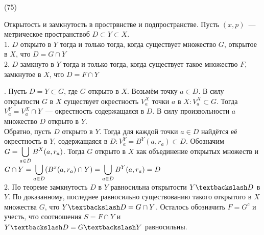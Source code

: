 (75)

\T \q Открытость и замкнутость в прострвнстве и подпространстве. Пусть $(x, p)$~--- метрическое пространствоб $D \subset Y\subset X$.\\
1. $D$ открыто в $Y$ тогда и только тогда, когда существует множество $G$, открытое в $X$, что $D = G \cap Y$\\
2. $D$ замкнуто в $Y$ тогда и только тогда, когда существует такое множество $F$, замкнутое в $X$, что $D = F\cap Y$

. Пусть $D = Y \subset G$, где $G$ открыто в $X$. Возьмём точку $a \in D$. В силу открытости $G$ в $X$ существует окрестность $V^X_a$ точки $a$ в $X: V^X_a \subset G$. Тогда $V^Y_a = V^X_a \cap Y$~--- окрестность содержащаяся в $D$. В силу произвольности $a$ множество $D$ открыто в $Y$.\\
Обратно, пусть $D$ открыто в $Y$. Тогда для каждой точки $a \in D$ найдётся её окрестность в $Y$, содержащаяся в $D: V^Y_a = B^Y(a, r_a) \subset D$. Обозначим $G = \displaystyle\bigcup_{a \in D} B^X(a, r_a)$. Тогда $G$ открыто в $X$ как объединение открытых множеств и $G \cap Y = \displaystyle\bigcup\limits_{a \in D}(B^x(a, r_a)\cap Y) = \bigcup\limits_{a \in D}B^Y(a, r_a) = D$\\
2. По теореме замкнутость $D$ в $Y$ равносильна открытости $Y\bsl D$ в $Y$. По доказанному, последнее равносильно существованию такого открытого в $X$ множества $G$, что $Y\bsl D = G \cap Y$. Осталось обозначить $F = G^c$ и учесть, что соотношения $S = F \cap Y$ и $Y\bsl D = G\bsl Y$ равносильны.